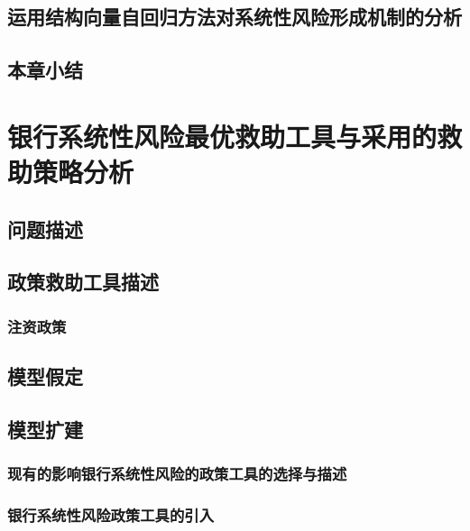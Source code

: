 \newpage
\subsection{运用结构向量自回归方法对系统性风险形成机制的分析}

\newpage
\subsection{本章小结}

\newpage
\section{银行系统性风险最优救助工具与采用的救助策略分析}

\newpage
\subsection{问题描述}

\newpage
\subsection{政策救助工具描述}

\subsubsection{注资政策}

\newpage
\subsection{模型假定}

\newpage
\subsection{模型扩建}

\subsubsection{现有的影响银行系统性风险的政策工具的选择与描述}


\subsubsection{银行系统性风险政策工具的引入}


